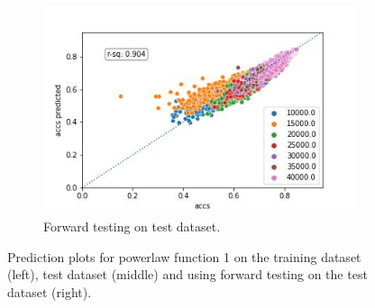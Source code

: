 \documentclass{article} %
\begin{document}
\begin{figure}
\begin{subfigure}{.33\textwidth}
    \end{subfigure}
    \begin{subfigure}{.33\textwidth}
        \centering
        \includegraphics[width=.8\linewidth]{cifar10/powerlaw_all_epochs_accs_hat_classes_arctan_epoch_artan_val_forward_testing.jpg}
        \caption{Forward testing on test dataset.}
        \label{fig:powerlaw_acc_classes_arctan_epoch_artan_forward_val}
    \end{subfigure}
    \caption{Prediction plots for powerlaw function 1 on the training dataset (left), test dataset (middle) and using forward testing on the test dataset (right).}
    \label{fig:powerlaw_prediction_plot_fct_1}
\end{figure}
\end{document}
